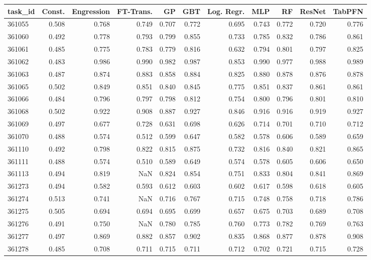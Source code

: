 \begin{tabular}{lrrrrrrrrrr}
\toprule
task\_id & Const. & Engression & FT-Trans. & GP & GBT & Log. Regr. & MLP & RF & ResNet & TabPFN \\
\midrule
361055 & 0.508 & 0.768 & 0.749 & 0.707 & 0.772 & 0.695 & 0.743 & 0.772 & 0.720 & 0.776 \\
361060 & 0.492 & 0.778 & 0.793 & 0.799 & 0.855 & 0.733 & 0.785 & 0.832 & 0.786 & 0.861 \\
361061 & 0.485 & 0.775 & 0.783 & 0.779 & 0.816 & 0.632 & 0.794 & 0.801 & 0.797 & 0.825 \\
361062 & 0.483 & 0.986 & 0.990 & 0.982 & 0.987 & 0.853 & 0.990 & 0.977 & 0.988 & 0.989 \\
361063 & 0.487 & 0.874 & 0.883 & 0.858 & 0.884 & 0.825 & 0.880 & 0.878 & 0.876 & 0.878 \\
361065 & 0.502 & 0.849 & 0.851 & 0.840 & 0.845 & 0.775 & 0.851 & 0.837 & 0.861 & 0.861 \\
361066 & 0.484 & 0.796 & 0.797 & 0.798 & 0.812 & 0.754 & 0.800 & 0.796 & 0.801 & 0.810 \\
361068 & 0.502 & 0.922 & 0.908 & 0.887 & 0.927 & 0.846 & 0.916 & 0.916 & 0.919 & 0.927 \\
361069 & 0.497 & 0.677 & 0.728 & 0.631 & 0.698 & 0.626 & 0.714 & 0.701 & 0.710 & 0.712 \\
361070 & 0.488 & 0.574 & 0.512 & 0.599 & 0.647 & 0.582 & 0.578 & 0.606 & 0.589 & 0.659 \\
361110 & 0.492 & 0.798 & 0.822 & 0.815 & 0.875 & 0.732 & 0.816 & 0.840 & 0.821 & 0.865 \\
361111 & 0.488 & 0.574 & 0.510 & 0.589 & 0.649 & 0.574 & 0.578 & 0.605 & 0.606 & 0.650 \\
361113 & 0.494 & 0.819 & NaN & 0.824 & 0.854 & 0.751 & 0.833 & 0.804 & 0.841 & 0.869 \\
361273 & 0.494 & 0.582 & 0.593 & 0.612 & 0.603 & 0.602 & 0.617 & 0.598 & 0.618 & 0.605 \\
361274 & 0.513 & 0.741 & NaN & 0.716 & 0.767 & 0.715 & 0.748 & 0.758 & 0.718 & 0.786 \\
361275 & 0.505 & 0.694 & 0.694 & 0.695 & 0.699 & 0.657 & 0.675 & 0.703 & 0.689 & 0.708 \\
361276 & 0.491 & 0.750 & NaN & 0.780 & 0.785 & 0.760 & 0.773 & 0.782 & 0.769 & 0.763 \\
361277 & 0.497 & 0.869 & 0.882 & 0.857 & 0.902 & 0.835 & 0.868 & 0.877 & 0.878 & 0.908 \\
361278 & 0.485 & 0.708 & 0.711 & 0.715 & 0.711 & 0.712 & 0.702 & 0.721 & 0.715 & 0.728 \\

\end{tabular}
